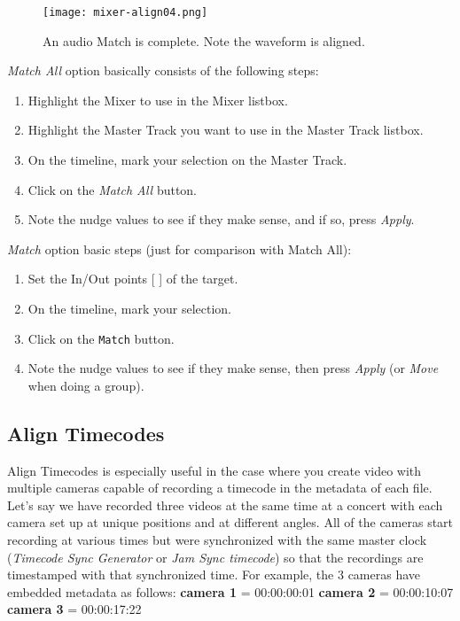 \begin{figure}[htpb]
	\centering
	\texttt{[image: mixer-align04.png]}
	\caption{An audio Match is complete. Note the waveform is aligned.}
	\label{fig:mixer-align04}
\end{figure}

\textit{Match All} option basically consists of the following steps:

\begin{enumerate}
	\item Highlight the Mixer to use in the Mixer listbox.
	\item Highlight the Master Track you want to use in the Master Track listbox.
	\item On the timeline, mark your selection on the Master Track.
	\item Click on the \textit{Match All} button.
	\item Note the nudge values to see if they make sense, and if so, press \textit{Apply}.
\end{enumerate}

\textit{Match} option basic steps (just for comparison with Match All):

\begin{enumerate}
	\item Set the In/Out points [ ] of the target.
	\item On the timeline, mark your selection.
	\item Click on the \texttt{Match} button.
	\item Note the nudge values to see if they make sense, then press \textit{Apply} (or \textit{Move} when doing a group).
\end{enumerate}

\subsection{Align Timecodes}%
\label{sub:align_timecodes}

Align Timecodes is especially useful in the case where you create video with multiple cameras capable of recording a timecode in the metadata of each file.  Let’s say we have recorded three videos at the same time at a concert with each camera set up at unique positions and at different angles.   All of the cameras start recording at various times but were synchronized with the same master clock (\textit{Timecode Sync Generator} or \textit{Jam Sync timecode}) so that the recordings are timestamped with that synchronized time.  For example, the 3 cameras have embedded metadata as follows: \quad \textbf{camera 1} = 00:00:00:01 \quad \textbf{camera 2} = 00:00:10:07 \quad \textbf{camera 3} = 00:00:17:22


